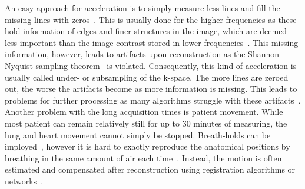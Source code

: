 An easy approach for acceleration is to simply measure less lines and fill the missing lines with zeros~\cite{DeepMRIReconstructionSubsampling}. This is usually done for the higher frequencies as these hold information of edges and finer structures in the image, which are deemed less important than the image contrast stored in lower frequencies~\cite{AdvancesPI}. This missing information, however, leads to artifacts upon reconstruction as the Shannon-Nyquist sampling theorem~\cite{Shannon} is violated. Consequently, this kind of acceleration is usually called under- or subsampling of the k-space. The more lines are zeroed out, the worse the artifacts become as more information is missing. This leads to problems for further processing as many algorithms struggle with these artifacts~\cite{DeepMRIReconstructionSubsampling}. \\
Another problem with the long acquisition times is patient movement. While most patient can remain relatively still for up to 30 minutes of measuring, the lung and heart movement cannot simply be stopped. Breath-holds can be imployed~\cite{Zaitsev2015}, however it is hard to exactly reproduce the anatomical positions by breathing in the same amount of air each time~\cite{Lin2022}. Instead, the motion is often estimated and compensated after reconstruction using registration algorithms or networks~\cite{Kuestner2022,Chen2023,GRICS}.

